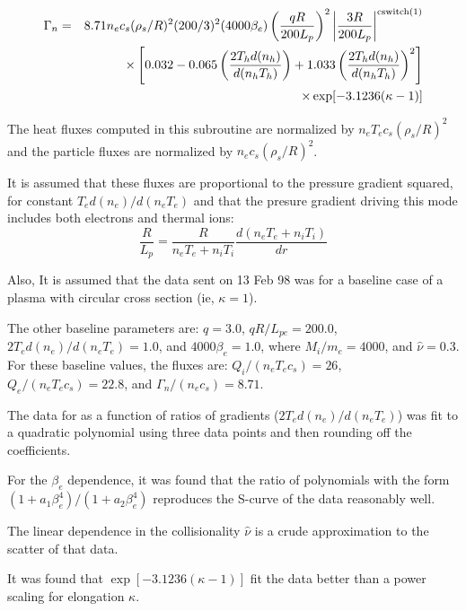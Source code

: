 \begin{eqnarray*}
\Gamma_n
 & = & 8.71 n_e c_s ( \rho_s / R )^2 ( 200 / 3 )^2
      ( 4000 \beta_e ) \left( \frac{ q R }{ 200 L_{p} } \right)^2
      \left| \frac{ 3 R }{ 200 L_p } \right|^{\rm cswitch(1)}  \\
 & &  \times \left[ 0.032
 - 0.065 \left( \frac{ 2 T_h d ( n_h ) }{ d ( n_h T_h ) } \right)
 + 1.033 \left( \frac{ 2 T_h d ( n_h ) }{ d ( n_h T_h ) } \right)^2
      \right] \\
 & & \times \exp [ -3.1236 ( \kappa - 1 ) ]
\end{eqnarray*}

	The heat fluxes computed in this subroutine are normalized by
$ n_e T_e c_s ( \rho_s / R )^2 $ and the particle fluxes are
normalized by $ n_e c_s ( \rho_s / R )^2 $.

	It is assumed that these fluxes are
proportional to the pressure
gradient squared, for constant $ T_e d ( n_e ) / d ( n_e T_e ) $
and that the presure gradient driving this mode includes
both electrons and thermal ions:
\[ \frac{ R }{ L_p } = \frac{ R }{ n_e T_e + n_i T_i }
  \frac{ d ( n_e T_e + n_i T_i ) }{ d r } \]

	Also, It is assumed that the data sent on 13 Feb 98 was
for a baseline case of a plasma with circular cross section
(ie, $ \kappa = 1 $).

	The other baseline parameters are:  $ q = 3.0 $,
$ q R / L_{pe} = 200.0 $, $ 2 T_e d ( n_e ) / d ( n_e T_e ) = 1.0 $,
and $ 4000 \beta_e = 1.0 $, where $ M_i / m_e = 4000 $, 
and $ \hat{\nu} = 0.3 $.
For these baseline values, the fluxes are:
$ Q_i / ( n_e T_e c_s ) = 26 $,
$ Q_e / ( n_e T_e c_s ) = 22.8 $, and
$ \Gamma_n / ( n_e c_s ) = 8.71$.

	The data for as a function of ratios of gradients
($ 2 T_e d ( n_e ) / d ( n_e T_e ) $) was fit to a quadratic
polynomial using three data points and then rounding off the
coefficients.

	For the $ \beta_e $ dependence, it was found that the ratio
of polynomials with the form
$ ( 1 + a_1 \beta_e^4 ) / ( 1 + a_2 \beta_e^4 ) $
reproduces the S-curve of the data reasonably well.

	The linear dependence in the collisionality $ \hat{ \nu } $ 
is a crude approximation to the scatter of that data.

	It was found that $ \exp [ -3.1236 ( \kappa - 1 ) ] $
fit the data better than a power scaling for elongation $ \kappa $.

